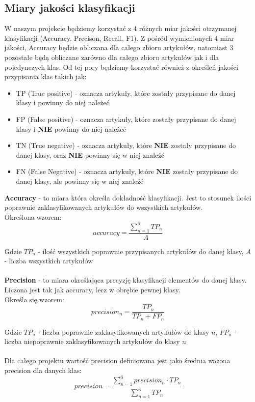 \documentclass{classrep}
\begin{document}
\subsection{Miary jakości klasyfikacji} 
W naszym projekcie będziemy korzystać z 4 różnych miar jakości otrzymanej klasyfikacji (Accuracy, Precison, Recall, F1). Z pośród wymienionych 4 miar jakości, Accuracy będzie obliczana dla całego zbioru artykułów, natomiast 3 pozostałe będą obliczane zarówno dla całego zbioru artykułów jak i dla pojedynczych klas. Od tej pory będziemy korzystać również z określeń jakości przypisania klas takich jak:\\
\begin{itemize}
\item TP (True positive) - oznacza artykuły, które zostały przypisane do danej klasy i powinny do niej należeć
\item FP (False positive) - oznacza artykuły, które zostały przypisane do danej klasy i \textbf{NIE} powinny do niej należeć
\item TN (True negative) - oznacza artykuły, które \textbf{NIE} zostały przypisane do danej klasy, oraz \textbf{NIE} powinny się w niej znaleźć
\item FN (False Negative) - oznacza artykuły, które \textbf{NIE} zostały przypisane do danej klasy, ale powinny się w niej znaleźć
\end{itemize}
{\bf Accuracy} - to miara która określa dokładność klasyfikacji. Jest to stosunek ilości poprawnie zaklasyfikowanych artykułów do wszystkich artykułów. \\
Określona wzorem:
\begin{equation}\label{accuracy}
accuracy = \frac{\sum^6_{n=1} TP_n}{A}
\end{equation}

Gdzie $TP_n$ - ilość wszystkich poprawnie przypisanych artykułów do danej klasy, $A$ - liczba wszystkich artykułów
\\\\

{\bf Precision} - to miara określająca precyzję klasyfikacji elementów do danej klasy. Liczona jest tak jak accuracy, lecz w obrębie pewnej klasy.\\
Określa się wzorem:
\begin{equation}\label{precision}
precision_n = \frac{TP_n}{TP_n + FP_n}
\end{equation}

Gdzie $TP_n$ - liczba poprawnie zaklasyfikowanych artykułów do klasy $n$, $FP_n$ - liczba niepoprawnie zaklasyfikowanych artykułów do klasy $n$
\\\\
Dla całego projektu wartość precision definiowana jest jako średnia ważona precision dla danych klas:
\begin{equation}
    precision = \frac{\sum_{n=1}^{6}precision_n \cdot TP_n}{\sum_{n=1}^{6}TP_n}
\end{equation}
\end{document}
